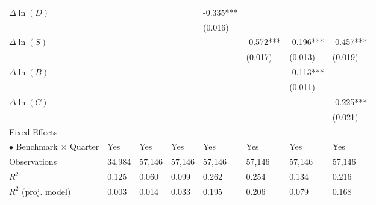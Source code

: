 \documentclass[openany]{book}
\theoremstyle{definition}
\theoremstyle{definition}
\theoremstyle{definition}
\theoremstyle{remark}
\begin{document}
\begin{table}[ht]
\begin{tabularx}{0.975\textwidth}{lYYYYYYY}
  $\Delta\ln(D)$ &  &  &  & -0.335*** &  &  &  \\ 
   &  &  &  & (0.016) &  &  &  \\ 
  $\Delta\ln(S)$ &  &  &  &  & -0.572*** & -0.196*** & -0.457*** \\ 
   &  &  &  &  & (0.017) & (0.013) & (0.019) \\ 
  $\Delta\ln(B)$ &  &  &  &  &  & -0.113*** &  \\ 
   &  &  &  &  &  & (0.011) &  \\ 
  $\Delta\ln(C)$ &  &  &  &  &  &  & -0.225*** \\ 
   &  &  &  &  &  &  & (0.021) \\ 
  Fixed Effects &  &  &  &  &  &  &  \\ 
  $\bullet$ Benchmark $\times$ Quarter & Yes & Yes & Yes & Yes & Yes & Yes & Yes \\ 
  Observations & 34,984 & 57,146 & 57,146 & 57,146 & 57,146 & 57,146 & 57,146 \\ 
  $R^2$ & 0.125 & 0.060 & 0.099 & 0.262 & 0.254 & 0.134 & 0.216 \\ 
  $R^2$ (proj. model) & 0.003 & 0.014 & 0.033 & 0.195 & 0.206 & 0.079 & 0.168 \\ 
   \bottomrule
\end{tabularx}
\endgroup
\end{table}
\end{document}

